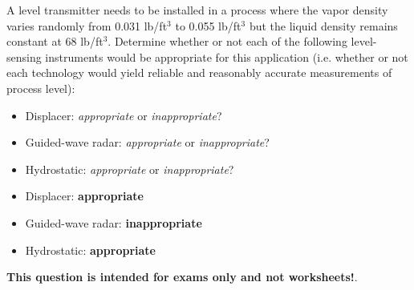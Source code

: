 

A level transmitter needs to be installed in a process where the vapor density varies randomly from 0.031 lb/ft$^{3}$ to 0.055 lb/ft$^{3}$ but the liquid density remains constant at 68 lb/ft$^{3}$.  Determine whether or not each of the following level-sensing instruments would be appropriate for this application (i.e. whether or not each technology would yield reliable and reasonably accurate measurements of process level):

\begin{itemize}
\item{} Displacer: {\it appropriate} or {\it inappropriate}?
\vskip 10pt
\item{} Guided-wave radar: {\it appropriate} or {\it inappropriate}?
\vskip 10pt
\item{} Hydrostatic: {\it appropriate} or {\it inappropriate}?
\end{itemize}







\begin{itemize}
\item{} Displacer: {\bf appropriate}
\vskip 10pt
\item{} Guided-wave radar: {\bf inappropriate}
\vskip 10pt
\item{} Hydrostatic: {\bf appropriate}
\end{itemize}







{\bf This question is intended for exams only and not worksheets!}.



